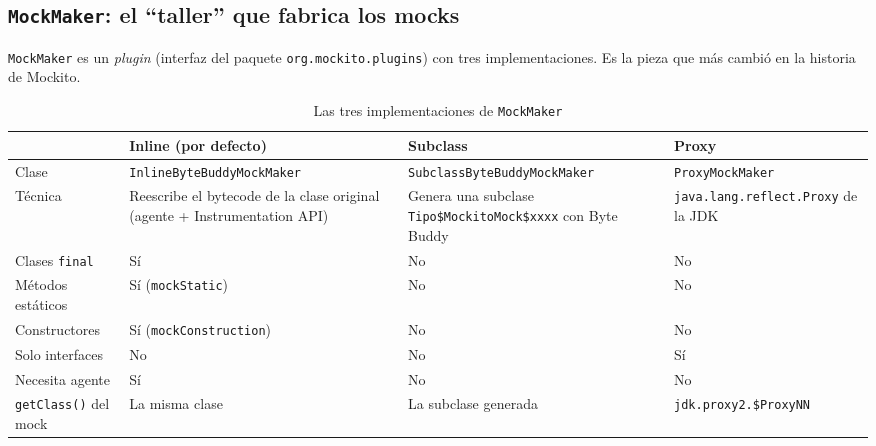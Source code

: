 \documentclass[11pt,a4paper,oneside]{report}
\newcommand{\code}[1]{\texttt{#1}}
\begin{document}
\subsection{\code{MockMaker}: el ``taller'' que fabrica los mocks}
\code{MockMaker} es un \emph{plugin} (interfaz del paquete \code{org.mockito.plugins}) con tres implementaciones. Es la pieza que más cambió en la historia de Mockito.

\begin{table}[H]
\centering
\caption{Las tres implementaciones de \code{MockMaker}}
\small
\begin{tabularx}{\linewidth}{lXXX}
\toprule
& \textbf{Inline} (por defecto) & \textbf{Subclass} & \textbf{Proxy}\\
\midrule
Clase & \code{InlineByteBuddyMockMaker} & \code{SubclassByteBuddyMockMaker} & \code{ProxyMockMaker}\\
Técnica & Reescribe el bytecode de la clase original (agente + Instrumentation API) & Genera una subclase \code{Tipo\$MockitoMock\$xxxx} con Byte Buddy & \code{java.lang.reflect.Proxy} de la JDK\\
Clases \code{final} & Sí & No & No\\
Métodos estáticos & Sí (\code{mockStatic}) & No & No\\
Constructores & Sí (\code{mockConstruction}) & No & No\\
Solo interfaces & No & No & Sí\\
Necesita agente & Sí & No & No\\
\code{getClass()} del mock & La misma clase & La subclase generada & \code{jdk.proxy2.\$ProxyNN}\\
\bottomrule
\end{tabularx}
\end{table}
\end{document}
